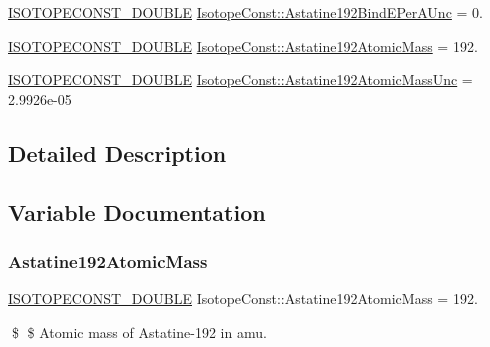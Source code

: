 \begin{DoxyCompactItemize}
\mbox{\hyperlink{group___isotope_const-_macros_ga8f45a7272ce02c0b4c65c44636ed719a}{I\+S\+O\+T\+O\+P\+E\+C\+O\+N\+S\+T\+\_\+\+D\+O\+U\+B\+LE}} \mbox{\hyperlink{group___isotope_const-_astatine-_at192_ga513b8ae8189089b1bfeedfa0e0b7de56}{Isotope\+Const\+::\+Astatine192\+Bind\+E\+Per\+A\+Unc}} = 0.
\item 
\mbox{\hyperlink{group___isotope_const-_macros_ga8f45a7272ce02c0b4c65c44636ed719a}{I\+S\+O\+T\+O\+P\+E\+C\+O\+N\+S\+T\+\_\+\+D\+O\+U\+B\+LE}} \mbox{\hyperlink{group___isotope_const-_astatine-_at192_ga0dd139278a023db55e27164ba00e945a}{Isotope\+Const\+::\+Astatine192\+Atomic\+Mass}} = 192.
\item 
\mbox{\hyperlink{group___isotope_const-_macros_ga8f45a7272ce02c0b4c65c44636ed719a}{I\+S\+O\+T\+O\+P\+E\+C\+O\+N\+S\+T\+\_\+\+D\+O\+U\+B\+LE}} \mbox{\hyperlink{group___isotope_const-_astatine-_at192_gad7d62db765ffef852606b8bd81aac0b3}{Isotope\+Const\+::\+Astatine192\+Atomic\+Mass\+Unc}} = 2.\+9926e-\/05
\end{DoxyCompactItemize}


\subsection{Detailed Description}


\subsection{Variable Documentation}
\mbox{\label{group___isotope_const-_astatine-_at192_ga0dd139278a023db55e27164ba00e945a}} 
\subsubsection{\texorpdfstring{Astatine192\+Atomic\+Mass}{Astatine192AtomicMass}}
{\footnotesize\ttfamily \mbox{\hyperlink{group___isotope_const-_macros_ga8f45a7272ce02c0b4c65c44636ed719a}{I\+S\+O\+T\+O\+P\+E\+C\+O\+N\+S\+T\+\_\+\+D\+O\+U\+B\+LE}} Isotope\+Const\+::\+Astatine192\+Atomic\+Mass = 192.}

\$ \$ Atomic mass of Astatine-\/192 in amu. \mbox{\label{group___isotope_const-_astatine-_at192_gad7d62db765ffef852606b8bd81aac0b3}} 
